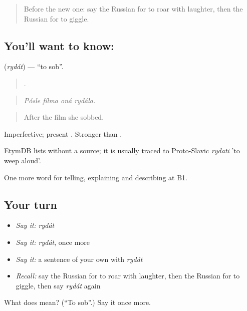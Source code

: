 \begin{quote}
Before the new one: say the Russian for to roar with laughter, then the Russian for to giggle.
\end{quote}

\subsection*{You'll want to know: }
\textbf{} (\emph{rydát}) — \textquotedblleft{}to sob\textquotedblright{}.

\begin{quote}
   .
\end{quote}

\begin{quote}
\emph{Pósle fílma oná rydála.}
\end{quote}

\begin{quote}
After the film she sobbed.
\end{quote}

Imperfective; present . Stronger than \emph{}.

\begin{cousinweb}
EtymDB lists \emph{} without a source; it is usually traced to Proto-Slavic \emph{rydati} 'to weep aloud'.
\end{cousinweb}

\begin{grammarlens}[title={What you've built}]
One more word for telling, explaining and describing at B1.
\end{grammarlens}

\subsection*{Your turn}
\begin{itemize}
\raggedright
  \item \emph{Say it:} \emph{rydát}
  \item \emph{Say it:} \emph{rydát}, once more
  \item \emph{Say it:} a sentence of your own with \emph{rydát}
  \item \emph{Recall:} say the Russian for to roar with laughter, then the Russian for to giggle, then say \emph{rydát} again
\end{itemize}

\begin{tcolorbox}[breakable,colback=teal!4,colframe=teal!35!black,title={Before you move on}]
What does  mean? (\textquotedblleft{}To sob\textquotedblright{}.) Say it once more.
\end{tcolorbox}
